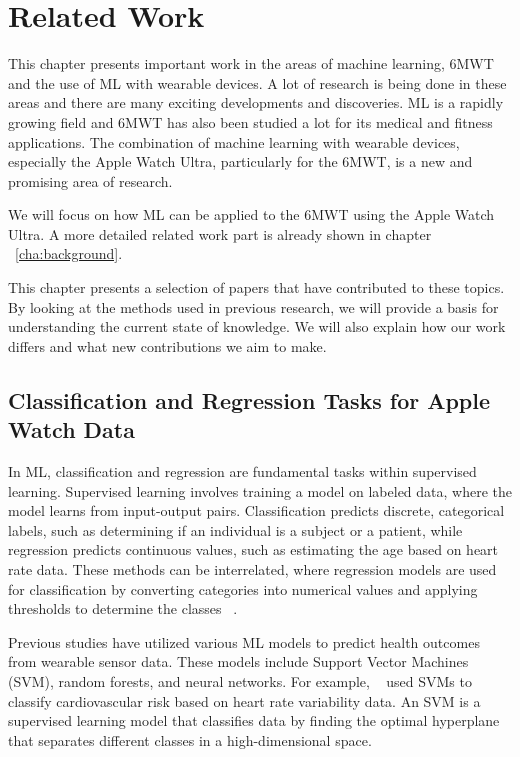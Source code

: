 \chapter{Related Work}
\label{cha:relatedwork}

This chapter presents important work in the areas of machine learning, 6MWT and the use of ML with wearable devices. A lot of research is being done in these areas and there are many exciting developments and discoveries. ML is a rapidly growing field and 6MWT has also been studied a lot for its medical and fitness applications. The combination of machine learning with wearable devices, especially the Apple Watch Ultra, particularly for the 6MWT, is a new and promising area of research.

We will focus on how ML can be applied to the 6MWT using the Apple Watch Ultra.  A more detailed related work part is already shown in chapter ~\ref{cha:background}.

This chapter presents a selection of papers that have contributed to these topics. By looking at the methods used in previous research, we will provide a basis for understanding the current state of knowledge. We will also explain how our work differs and what new contributions we aim to make.

\section{Classification and Regression Tasks for Apple Watch Data}

In ML, classification and regression are fundamental tasks within supervised learning. Supervised learning involves training a model on labeled data, where the model learns from input-output pairs. Classification predicts discrete, categorical labels, such as determining if an individual is a subject or a patient, while regression predicts continuous values, such as estimating the age based on heart rate data. These methods can be interrelated, where regression models are used for classification by converting categories into numerical values and applying thresholds to determine the classes ~\cite{bishop2006pattern}.

Previous studies have utilized various ML models to predict health outcomes from wearable sensor data. These models include Support Vector Machines (SVM), random forests, and neural networks. For example, ~\textcite{Bailey} used SVMs to classify cardiovascular risk based on heart rate variability data. An SVM is a supervised learning model that classifies data by finding the optimal hyperplane that separates different classes in a high-dimensional space.

